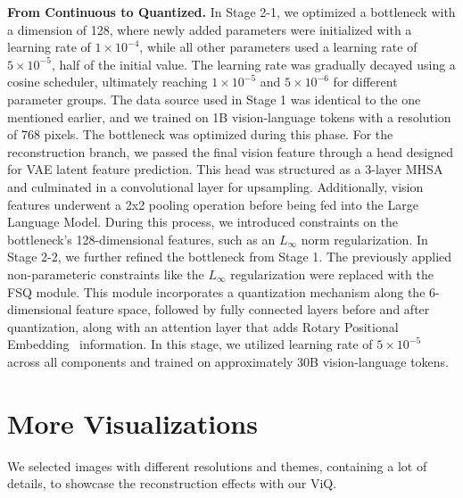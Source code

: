 \documentclass{llmxive}
\providecommand{\paragrapha}[1]{\par\addvspace{0.45em}\noindent\textbf{#1}}
\begin{document}
\paragrapha{From Continuous to Quantized. }
In Stage 2-1, we optimized a bottleneck with a dimension of 128, where newly added parameters were initialized with a learning rate of $1\times 10^{-4}$, while all other parameters used a learning rate of $5\times 10^{-5}$, half of the initial value. The learning rate was gradually decayed using a cosine scheduler, ultimately reaching $1\times 10^{-5}$ and $5\times 10^{-6}$ for different parameter groups. The data source used in Stage 1 was identical to the one mentioned earlier, and we trained on 1B vision-language tokens with a resolution of 768 pixels. The bottleneck was optimized during this phase. For the reconstruction branch, we passed the final vision feature through a head designed for VAE latent feature prediction. This head was structured as a 3-layer MHSA and culminated in a convolutional layer for upsampling. Additionally, vision features underwent a 2x2 pooling operation before being fed into the Large Language Model. During this process, we introduced constraints on the bottleneck's 128-dimensional features, such as an $L_{\infty}$ norm regularization. In Stage 2-2, we further refined the bottleneck from Stage 1. The previously applied non-parameteric constraints like the $L_{\infty}$ regularization were replaced with the FSQ module. This module incorporates a quantization mechanism along the 6-dimensional feature space, followed by fully connected layers before and after quantization, along with an attention layer that adds Rotary Positional Embedding~\cite{su2024roformer} information. In this stage, we utilized learning rate of $5\times 10^{-5}$ across all components and trained on approximately 30B vision-language tokens.

\section{More Visualizations}
We selected images with different resolutions and themes, containing a lot of details, to showcase the reconstruction effects with our ViQ.
\end{document}
